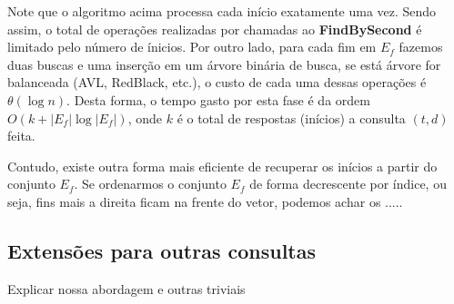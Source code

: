\documentclass[12pt]{article}
\begin{document}
Note que o algoritmo acima processa cada início exatamente uma vez.
Sendo assim, o total de operações realizadas por chamadas ao {\bf FindBySecond}
é limitado pelo número de ínicios. Por outro lado, para cada fim em $E_f$ fazemos
duas buscas e uma inserção em um árvore binária de busca, se está árvore for balanceada (AVL, RedBlack, etc.),
 o custo de cada uma dessas operações é $\theta(\log n)$. Desta forma, o tempo gasto por esta fase é da ordem $O(k + |E_f|\log |E_f|)$,
 onde $k$ é o total de respostas (inícios) a consulta $(t, d)$ feita.

Contudo, existe outra forma mais eficiente de recuperar os inícios a partir do conjunto
$E_f$. Se ordenarmos o conjunto $E_f$ de forma decrescente por índice, ou seja, fins mais a direita
ficam na frente do vetor, podemos achar os .....










%



\subsection{Extensões para outras consultas}
 Explicar nossa abordagem e outras triviais
\end{document}
